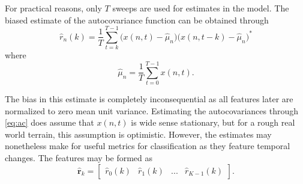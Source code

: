 





For practical reasons, only $T$ sweeps are used for estimates in the model. The biased estimate of the autocovariance function can be obtained through \citep{jakobsson_2015}
\begin{equation}
\label{eq:ac}
	\hat{r}_n(k) = \frac{1}{T}\sum_{t=k}^{T-1}\big(x(n,t) - \hat{\mu}_n\big)\big(x(n,t-k) - \hat{\mu}_n\big)^*
\end{equation}
where 
\begin{equation}
	\hat{\mu}_n = \frac1T \sum_{t=0}^{T-1}x(n,t).
\end{equation}

The bias in this estimate is completely inconsequential as all features later are normalized to zero mean unit variance. Estimating the autocovariances through \eqref{eq:ac} does assume that $x(n,t)$ is wide sense stationary, but for a rough real world terrain, this assumption is optimistic. However, the estimates may nonetheless make for useful metrics for classification as they feature temporal changes. The features may be formed as
\begin{equation}
	\hat{\mathbf{r}}_{k} = 
	\begin{bmatrix}
		\hat{r}_0(k) & \hat{r}_1(k) & ... & \hat{r}_{K-1}(k)
	\end{bmatrix}.
\end{equation}

